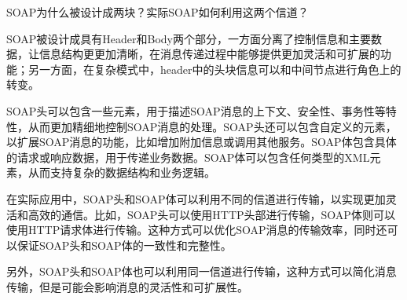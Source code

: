 \begin{problem}
SOAP为什么被设计成两块？实际SOAP如何利用这两个信道？
\end{problem}

\begin{solution}
SOAP被设计成具有Header和Body两个部分，一方面分离了控制信息和主要数据，让信息结构更更加清晰，在消息传递过程中能够提供更加灵活和可扩展的功能；另一方面，在复杂模式中，header中的头块信息可以和中间节点进行角色上的转变。

SOAP头可以包含一些元素，用于描述SOAP消息的上下文、安全性、事务性等特性，从而更加精细地控制SOAP消息的处理。SOAP头还可以包含自定义的元素，以扩展SOAP消息的功能，比如增加附加信息或调用其他服务。SOAP体包含具体的请求或响应数据，用于传递业务数据。SOAP体可以包含任何类型的XML元素，从而支持复杂的数据结构和业务逻辑。

在实际应用中，SOAP头和SOAP体可以利用不同的信道进行传输，以实现更加灵活和高效的通信。比如，SOAP头可以使用HTTP头部进行传输，SOAP体则可以使用HTTP请求体进行传输。这种方式可以优化SOAP消息的传输效率，同时还可以保证SOAP头和SOAP体的一致性和完整性。

另外，SOAP头和SOAP体也可以利用同一信道进行传输，这种方式可以简化消息传输，但是可能会影响消息的灵活性和可扩展性。
\end{solution}